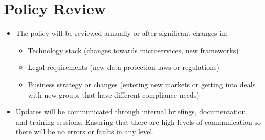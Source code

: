 \section{Policy Review}
\begin{itemize}
    \item The policy will be reviewed annually or after significant changes in:
    \begin{itemize}
        \item Technology stack (changes towards microservices, new frameworks)
        \item Legal requirements (new data protection laws or regulations)
        \item Business strategy or changes  (entering new markets or getting into deals with new groups that have different compliance needs)
    \end{itemize}
    \item Updates will be communicated through internal briefings, documentation, and training sessions. Ensuring that there are high levels of communication so there will be no errors or faults in any level. 
\end{itemize}